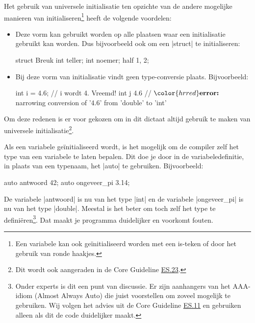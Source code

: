 \begin{cpplstShortInline}
Het gebruik van universele initialisatie ten opzichte van de andere mogelijke manieren van initialiseren\footnote{%
	Een variabele kan ook geïnitialiseerd worden met een is-teken of door het gebruik van ronde haakjes.  
} heeft de volgende voordelen:
\begin{itemize}
	\item Deze vorm kan gebruikt worden op alle plaatsen waar een initialisatie gebruikt kan worden. 
	Dus bijvoorbeeld ook om een |struct| te initialiseren:
\begin{cpplstfragment}
	struct Breuk {
		int teller;
		int noemer;
	} half {1, 2};
\end{cpplstfragment}
	\item Bij deze vorm van initialisatie vindt geen type-conversie plaats.
	Bijvoorbeeld:
\begin{cpplstfragment}[mathescape=true]
	int i = 4.6; // i wordt 4. Vreemd!
	int j {4.6} // $\color{hrred}\textbf{error:}$ narrowing conversion of '4.6' from 'double' to 'int'
\end{cpplstfragment}
\end{itemize}
Om deze redenen is er voor gekozen om in dit dictaat altijd gebruik te maken van universele initialisatie\footnote{%
	Dit wordt ook aangeraden in de \Cpp{} Core Guideline \href{https://isocpp.github.io/CppCoreGuidelines/CppCoreGuidelines\#es23-prefer-the--initializer-syntax}{ES.23}.
}.	

\label{sec:autotype}
Als een variabele geïnitialiseerd wordt, is het mogelijk om de compiler zelf het type van een variabele te laten bepalen. 
Dit doe je door in de variabeledefinitie, in plaats van een typenaam, het  |auto| te gebruiken.
Bijvoorbeeld:
\begin{cpplstfragment}
	auto antwoord {42};
	auto ongeveer_pi {3.14};
\end{cpplstfragment}

De variabele |antwoord| is nu van het type |int| en de variabele |ongeveer_pi| is nu van het type |double|.
Meestal is het beter om toch zelf het type te definiëren\footnote{%
	Onder \Cpp{} experts is dit een punt van discussie. 
	Er zijn aanhangers van het AAA-idiom (Almost Always Auto) die juist voorstellen om zoveel mogelijk  te gebruiken.
	Wij volgen het advies uit de \Cpp{} Core Guideline \href{https://isocpp.github.io/CppCoreGuidelines/CppCoreGuidelines\#es11-use-auto-to-avoid-redundant-repetition-of-type-names}{ES.11} en gebruiken  alleen als dit de code duidelijker maakt. 
}.
Dat maakt je programma duidelijker en voorkomt fouten.


\end{cpplstShortInline}
